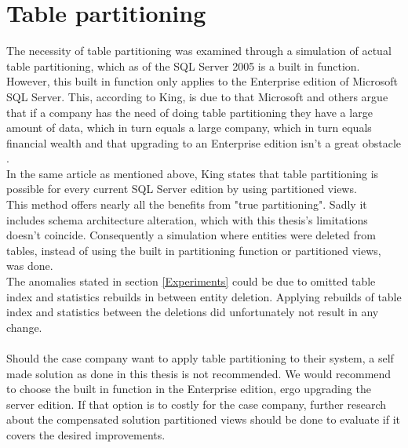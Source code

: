 \documentclass{cslthse-msc}
\begin{document}
\section{Table partitioning}
The necessity of table partitioning was examined through a simulation of actual table partitioning, which as of the SQL Server 2005 is a built in function. However, this built in function only applies to the Enterprise edition of Microsoft SQL Server. This, according to King, is due to that Microsoft and others argue that if a company has the need of doing table partitioning they have a large amount of data, which in turn equals a large company, which in turn equals financial wealth and that upgrading to an Enterprise edition isn't a great obstacle \cite{partitionwoEnterprise}. \\ In the same article as mentioned above, King states that table partitioning is possible for every current SQL Server edition by using partitioned views.\\ This method offers nearly all the benefits from "true partitioning". Sadly it includes schema architecture alteration, which with this thesis's limitations doesn't coincide. Consequently a simulation where entities were deleted from tables, instead of using the built in partitioning function or partitioned views, was done.\\
The anomalies stated in section \ref{Experiments} could be due to omitted table index and statistics rebuilds in between entity deletion. Applying rebuilds of table index and statistics between the deletions did unfortunately not result in any change. \\\\
Should the case company want to apply table partitioning to their system, a self made solution as done in this thesis is not recommended. We would recommend to choose the built in function in the Enterprise edition, ergo upgrading the server edition. If that option is to costly for the case company, further research about the compensated solution partitioned views should be done to evaluate if it covers the desired improvements. 
\end{document}

